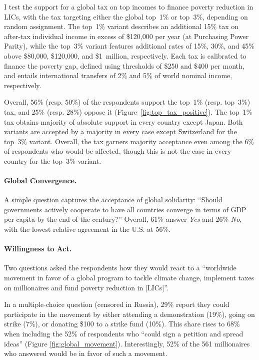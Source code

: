 \documentclass[12pt,english]{article}
\begin{document}
\begin{bibunit}
I test the support for a global tax on top incomes to finance poverty reduction in LICs, with the tax targeting either the global top~1\% or top~3\%, depending on random assignment. The top~1\% variant describes an additional 15\% tax on after-tax individual income in excess of \$120,000 per year (at Purchasing Power Parity), while the top~3\% variant features additional rates of 15\%, 30\%, and 45\% above \$80,000, \$120,000, and \$1~million, respectively. Each tax is calibrated to finance the poverty gap, defined using thresholds of \$250 and \$400 per month, and entails international transfers of 2\% and 5\% of world nominal income, respectively.

Overall, 56\% (resp. 50\%) of the respondents support the top~1\% (resp. top~3\%) tax, and 25\% (resp. 28\%) oppose it (Figure~\ref{fig:top_tax_positive}).
The top~1\% tax obtains majority of absolute support in every country except Japan.
Both variants are accepted by a majority in every case except Switzerland for the top~3\% variant.
Overall, the tax garners majority acceptance
even among the 6\% of respondents who would be affected, though this is not the case in every country for the top~3\% variant.

\paragraph{Global Convergence.}\label{par:convergence}

A simple question captures the acceptance of global solidarity: ``Should governments actively cooperate to have all countries converge in terms of GDP per capita by the end of the century?'' Overall, 61\% answer \textit{Yes} and 26\% \textit{No}, with the lowest relative agreement %
in the U.S. at 56\%.

\paragraph{Willingness to Act.}\label{par:willingness_act}

Two questions asked the respondents how they would react to a ``worldwide movement in favor of a global program to tackle climate change, implement taxes on millionaires and fund poverty reduction in [LICs]''.

In a multiple-choice question (censored in Russia), 29\% report they could participate in the movement by either attending a demonstration (19\%), going on strike (7\%), or donating \$100 to a strike fund (10\%). This share rises to 68\% when including the 52\% of respondents who ``could sign a petition and spread ideas'' (Figure \ref{fig:global_movement}).
Interestingly, 52\% of the 561 millionaires %
who answered would be in favor of such a movement.


\end{bibunit}
\end{document}
